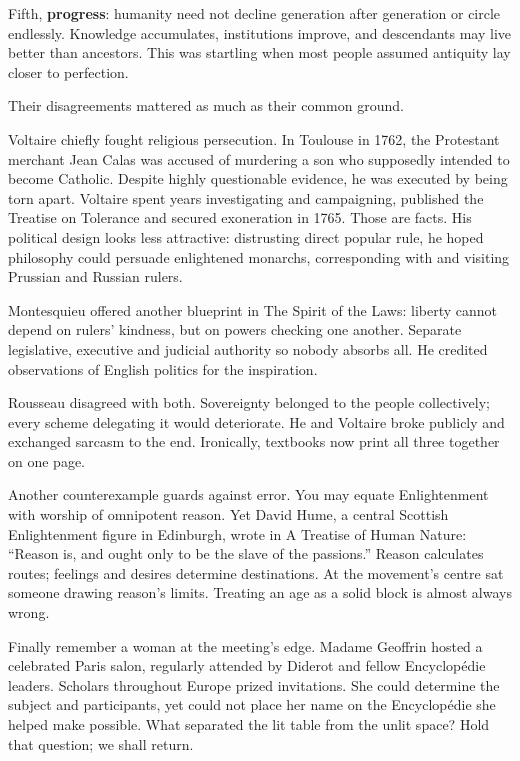 Fifth, \textbf{progress}: humanity need not decline generation after generation or circle endlessly. Knowledge accumulates, institutions improve, and descendants may live better than ancestors. This was startling when most people assumed antiquity lay closer to perfection.

Their disagreements mattered as much as their common ground.

Voltaire chiefly fought religious persecution. In Toulouse in 1762, the Protestant merchant Jean Calas was accused of murdering a son who supposedly intended to become Catholic. Despite highly questionable evidence, he was executed by being torn apart. Voltaire spent years investigating and campaigning, published the Treatise on Tolerance and secured exoneration in 1765. Those are facts. His political design looks less attractive: distrusting direct popular rule, he hoped philosophy could persuade enlightened monarchs, corresponding with and visiting Prussian and Russian rulers.

Montesquieu offered another blueprint in The Spirit of the Laws: liberty cannot depend on rulers' kindness, but on powers checking one another. Separate legislative, executive and judicial authority so nobody absorbs all. He credited observations of English politics for the inspiration.

Rousseau disagreed with both. Sovereignty belonged to the people collectively; every scheme delegating it would deteriorate. He and Voltaire broke publicly and exchanged sarcasm to the end. Ironically, textbooks now print all three together on one page.

Another counterexample guards against error. You may equate Enlightenment with worship of omnipotent reason. Yet David Hume, a central Scottish Enlightenment figure in Edinburgh, wrote in A Treatise of Human Nature: ``Reason is, and ought only to be the slave of the passions.'' Reason calculates routes; feelings and desires determine destinations. At the movement's centre sat someone drawing reason's limits. Treating an age as a solid block is almost always wrong.

Finally remember a woman at the meeting's edge. Madame Geoffrin hosted a celebrated Paris salon, regularly attended by Diderot and fellow Encyclopédie leaders. Scholars throughout Europe prized invitations. She could determine the subject and participants, yet could not place her name on the Encyclopédie she helped make possible. What separated the lit table from the unlit space? Hold that question; we shall return.

